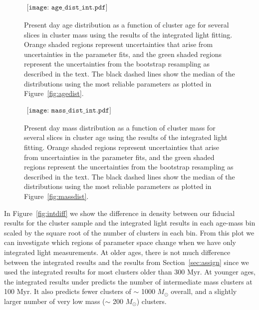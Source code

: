 \documentclass{emulateapj}
\begin{document}
\begin{figure*}[!htbp]
   \begin{center}$
      \begin{array}{cc}
         \texttt{[image: age\_dist\_int.pdf]} 
      \end{array}$
   \end{center}
  \caption{Present day age distribution as a function of cluster age for several slices in cluster mass using the results of the integrated light fitting.  Orange shaded regions represent uncertainties that arise from uncertainties in the parameter fits, and the green shaded regions represent the uncertainties from the bootstrap resampling as described in the text.  The black dashed lines show the median of the distributions using the most reliable parameters as plotted in Figure~\ref{fig:agedist}.}
  \label{fig:intagedist}
\end{figure*}



\begin{figure*}[!htbp]
   \begin{center}$
      \begin{array}{cc}
         \texttt{[image: mass\_dist\_int.pdf]} 
      \end{array}$
   \end{center}
  \caption{Present day mass distribution as a function of cluster mass for several slices in cluster age using the results of the integrated light fitting.  Orange shaded regions represent uncertainties that arise from uncertainties in the parameter fits, and the green shaded regions represent the uncertainties from the bootstrap resampling as described in the text.  The black dashed lines show the median of the distributions using the most reliable parameters as plotted in Figure~\ref{fig:massdist}.}
  \label{fig:intmassdist}
\end{figure*}


In Figure~\ref{fig:intdiff} we show the difference in density between our fiducial results for the cluster sample and the integrated light results in each age-mass bin scaled by the square root of the number of clusters in each bin.  From this plot we can investigate which regions of parameter space change when we have only integrated light measurements.  At older ages, there is not much difference between the integrated results and the results from Section~\ref{sec:assign} since we used the integrated results for most clusters older than 300 Myr.  At younger ages, the integrated results under predicts the number of intermediate mass clusters at 100 Myr.  It also predicts fewer clusters of $\sim$ 1000 $M_{\odot}$ overall, and a slightly larger number of very low mass ($\sim$ 200 $M_{\odot}$) clusters. 
\end{document}
